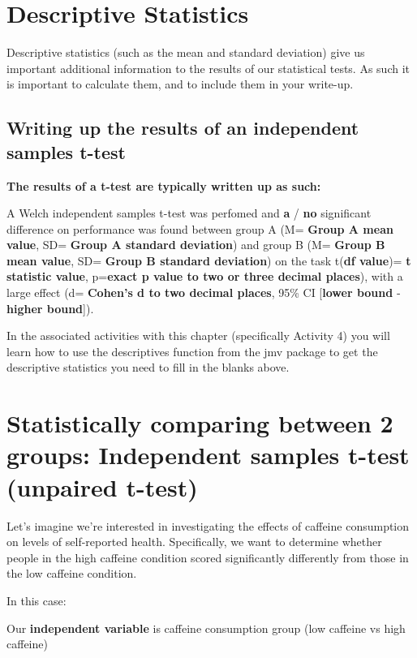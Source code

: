 \documentclass[
]{book}
\begin{document}
\section{Descriptive Statistics}\label{descriptive-statistics}

Descriptive statistics (such as the mean and standard deviation) give us important additional information to the results of our statistical tests. As such it is important to calculate them, and to include them in your write-up.

\subsection{Writing up the results of an independent samples t-test}\label{writing-up-the-results-of-an-independent-samples-t-test}

\textbf{The results of a t-test are typically written up as such:}

A Welch independent samples t-test was perfomed and \textbf{a} / \textbf{no} significant difference on performance was found between group A (M= \textbf{Group A mean value}, SD= \textbf{Group A standard deviation}) and group B (M= \textbf{Group B mean value}, SD= \textbf{Group B standard deviation}) on the task t(\textbf{df value})= \textbf{t statistic value}, p=\textbf{exact p value to two or three decimal places}), with a large effect (d= \textbf{Cohen's d to two decimal places}, 95\% CI {[}\textbf{lower bound} ‐ \textbf{higher bound}{]}).

In the associated activities with this chapter (specifically Activity 4) you will learn how to use the descriptives function from the jmv package to get the descriptive statistics you need to fill in the blanks above.

\section{Statistically comparing between 2 groups: Independent samples t-test (unpaired t-test)}\label{statistically-comparing-between-2-groups-independent-samples-t-test-unpaired-t-test}

Let's imagine we're interested in investigating the effects of caffeine consumption on levels of self-reported health. Specifically, we want to determine whether people in the high caffeine condition scored significantly differently from those in the low caffeine condition.

In this case:

Our \textbf{independent variable} is caffeine consumption group (low caffeine vs high caffeine)
\end{document}
